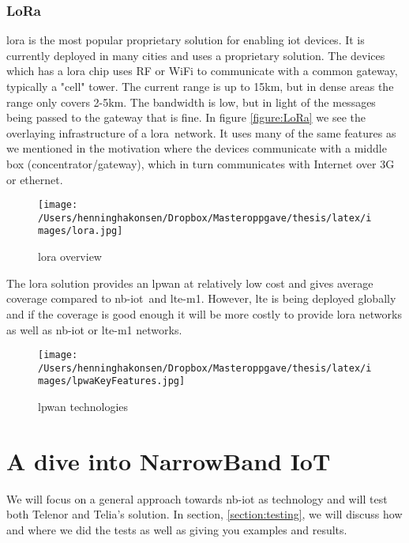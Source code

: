 \documentclass[USenglish]{ifimaster}  %
\begin{document}
\subsection{LoRa}
\acrshort{lora} \cite{online:LoRa} is the most popular proprietary solution for enabling \acrshort{iot} devices. It is currently deployed in many cities and uses a proprietary solution. The devices which has a \acrshort{lora} chip uses RF or WiFi to communicate with a common gateway, typically a "cell" tower. The current range is up to 15km, but in dense areas the range only covers 2-5km. The bandwidth is low, but in light of the messages being passed to the gateway that is fine. In figure \vref{figure:LoRa} we see the overlaying infrastructure of a \acrshort{lora} network. It uses many of the same features as we mentioned in the motivation where the devices communicate with a middle box (concentrator/gateway), which in turn communicates with Internet over 3G or ethernet.

\begin{figure}[ht]
  \centering\texttt{[image: /Users/henninghakonsen/Dropbox/Masteroppgave/thesis/latex/images/lora.jpg]}
  \caption[\acrshort{lora} overview]{\acrshort{lora} overview \cite{online:LoRa}}
  \label{figure:LoRa}
\end{figure}

The \acrshort{lora} solution provides an \acrshort{lpwan} at relatively low cost and gives average coverage compared to \acrshort{nb-iot} and \acrshort{lte-m1}. However, \acrshort{lte} is being deployed globally and if the coverage is good enough it will be more costly to provide \acrshort{lora} networks as well as \acrshort{nb-iot} or \acrshort{lte-m1} networks.

\begin{figure}[ht]
  \centering\texttt{[image: /Users/henninghakonsen/Dropbox/Masteroppgave/thesis/latex/images/lpwaKeyFeatures.jpg]}
  \caption[\acrshort{lpwan} technologies]{\acrshort{lpwan} technologies \cite{online:legacyWire}}
  \label{figure:legacyWire}
\end{figure}

\chapter{A dive into NarrowBand IoT} \label{section:nb-iot}
We will focus on a general approach towards \acrshort{nb-iot} as technology and will test both Telenor and Telia's solution. In section, \vref{section:testing}, we will discuss how and where we did the tests as well as giving you examples and results.
\end{document}
